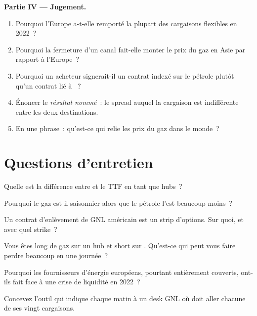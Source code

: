 \begin{problem}
\medskip\noindent\textbf{Partie IV --- Jugement.}
\begin{enumerate}[resume]
\item Pourquoi l'Europe a-t-elle remporté la plupart des cargaisons flexibles en 2022~?
\item Pourquoi la fermeture d'un canal fait-elle monter le prix du gaz en Asie par rapport à l'Europe~?
\item Pourquoi un acheteur signerait-il un contrat indexé sur le pétrole plutôt qu'un contrat lié à ~?
\item Énoncer le \emph{résultat nommé}~: le spread auquel la cargaison est indifférente entre
les deux destinations.
\item En une phrase~: qu'est-ce qui relie les prix du gaz dans le monde~?
\end{enumerate}
\end{problem}

\section{Questions d'entretien}

\begin{interviewq}\label{iq:m3:natural-gas-and-lng:1}
Quelle est la différence entre  et le TTF en tant que hubs~?
\end{interviewq}

\begin{interviewq}\label{iq:m3:natural-gas-and-lng:2}
Pourquoi le gaz est-il saisonnier alors que le pétrole l'est beaucoup moins~?
\end{interviewq}

\begin{interviewq}\label{iq:m3:natural-gas-and-lng:3}
Un contrat d'enlèvement de GNL américain est un strip d'options. Sur quoi, et avec quel strike~?
\end{interviewq}

\begin{interviewq}\label{iq:m3:natural-gas-and-lng:4}
Vous êtes long de gaz sur un hub et short sur . Qu'est-ce qui peut vous faire perdre beaucoup en une journée~?
\end{interviewq}

\begin{interviewq}\label{iq:m3:natural-gas-and-lng:5}
Pourquoi les fournisseurs d'énergie européens, pourtant entièrement couverts, ont-ils fait face à une crise de liquidité en 2022~?
\end{interviewq}

\begin{interviewq}\label{iq:m3:natural-gas-and-lng:6}
Concevez l'outil qui indique chaque matin à un desk GNL où doit aller chacune de ses vingt
cargaisons.
\end{interviewq}
